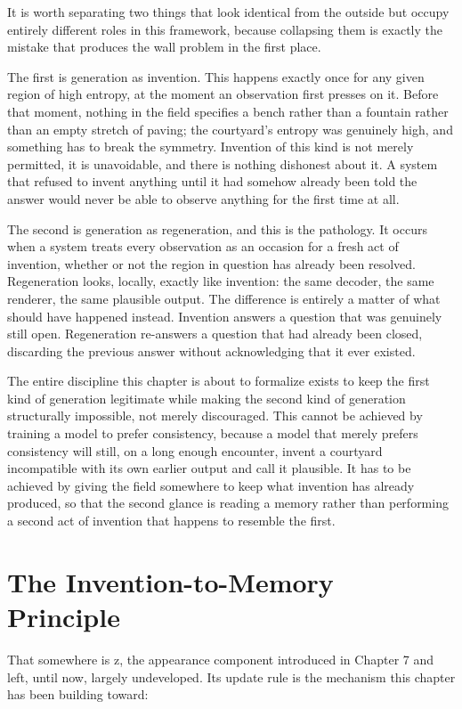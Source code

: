 It is worth separating two things that look identical from the outside but occupy entirely different roles in this framework, because collapsing them is exactly the mistake that produces the wall problem in the first place.

The first is generation as invention. This happens exactly once for any given region of high entropy, at the moment an observation first presses on it. Before that moment, nothing in the field specifies a bench rather than a fountain rather than an empty stretch of paving; the courtyard's entropy was genuinely high, and something has to break the symmetry. Invention of this kind is not merely permitted, it is unavoidable, and there is nothing dishonest about it. A system that refused to invent anything until it had somehow already been told the answer would never be able to observe anything for the first time at all.

The second is generation as regeneration, and this is the pathology. It occurs when a system treats every observation as an occasion for a fresh act of invention, whether or not the region in question has already been resolved. Regeneration looks, locally, exactly like invention: the same decoder, the same renderer, the same plausible output. The difference is entirely a matter of what should have happened instead. Invention answers a question that was genuinely still open. Regeneration re-answers a question that had already been closed, discarding the previous answer without acknowledging that it ever existed.

The entire discipline this chapter is about to formalize exists to keep the first kind of generation legitimate while making the second kind of generation structurally impossible, not merely discouraged. This cannot be achieved by training a model to prefer consistency, because a model that merely prefers consistency will still, on a long enough encounter, invent a courtyard incompatible with its own earlier output and call it plausible. It has to be achieved by giving the field somewhere to keep what invention has already produced, so that the second glance is reading a memory rather than performing a second act of invention that happens to resemble the first.

\section{The Invention-to-Memory Principle}

That somewhere is z, the appearance component introduced in Chapter 7 and left, until now, largely undeveloped. Its update rule is the mechanism this chapter has been building toward:


